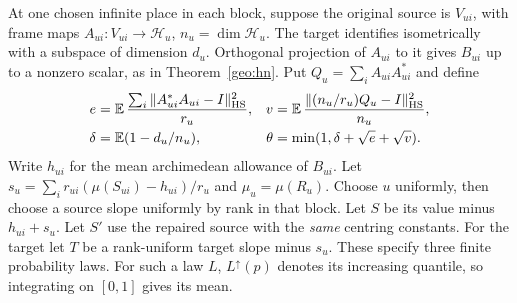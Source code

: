 At one chosen infinite place in each block, suppose the original
source is \(V_{ui}\), with frame maps \(A_{ui}:V_{ui}\to\mathcal H_u\),
\(n_u=\dim\mathcal H_u\). The target identifies isometrically with
a subspace of dimension \(d_u\). Orthogonal projection of \(A_{ui}\)
to it gives \(B_{ui}\) up to a nonzero scalar, as in
Theorem~\ref{geo:hn}. Put \(Q_u=\sum_i A_{ui}A_{ui}^*\) and define
\[
\begin{aligned}
 e&=\mathbb E\,\frac{\sum_i\|A_{ui}^*A_{ui}-I\|_{\rm HS}^2}{r_u},
 &v&=\mathbb E\,\frac{\|(n_u/r_u)Q_u-I\|_{\rm HS}^2}{n_u},\\
 \delta&=\mathbb E(1-d_u/n_u),
 &\theta&=\min(1,\delta+\sqrt e+\sqrt v).
\end{aligned}
\]
Write \(h_{ui}\) for the mean archimedean allowance of \(B_{ui}\).
Let \(s_u=\sum_i r_{ui}(\mu(S_{ui})-h_{ui})/r_u\) and
\(\mu_u=\mu(R_u)\). Choose \(u\) uniformly, then choose a source
slope uniformly by rank in that block. Let \(S\) be its value
minus \(h_{ui}+s_u\). Let \(S'\) use the repaired source with the
\emph{same} centring constants. For the target let \(T\) be a
rank-uniform target slope minus \(s_u\). These specify three finite
probability laws. For such a law \(L\), \(L^\uparrow(p)\) denotes
its increasing quantile, so integrating on \([0,1]\) gives its mean.

